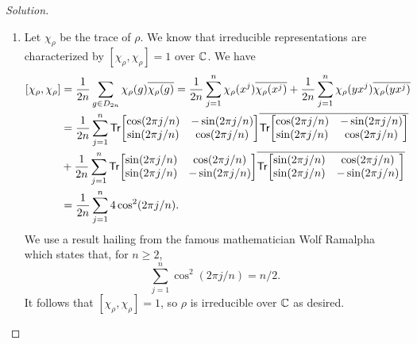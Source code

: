 \begin{proof}[Solution]
\begin{enumerate}[font=\normalfont,label=\textbf{(\alph*)}, wide]
\item Let $\chi_\rho$ be the trace of $\rho$. We know that irreducible representations are characterized by $[\chi_\rho, \chi_\rho] = 1$ over $\mathbb{C}$. We have
\[
\begin{aligned}
[\chi_\rho, \chi_\rho] &= \frac{1}{2n}\sum_{g \in D_{2n}}  \chi_\rho(g)\overline{\chi_\rho(g)} = \frac{1}{2n}\sum_{j = 1}^n  \chi_\rho(x^j)\overline{\chi_\rho(x^j)} + \frac{1}{2n}\sum_{j = 1}^n  \chi_\rho(yx^j)\overline{\chi_\rho(yx^j)} \\
&= \frac{1}{2n}\sum_{j = 1}^n
\Tr{
\begin{bmatrix}
\cos(2\pi j/n) & -\sin(2\pi j/n) \\
\sin(2\pi j/n) & \cos(2\pi j/n)
\end{bmatrix}
}
\overline{
\Tr{
\begin{bmatrix}
\cos(2\pi j/n) & -\sin(2\pi j/n) \\
\sin(2\pi j/n) & \cos(2\pi j/n)
\end{bmatrix}
}
} \\
&+
\frac{1}{2n}\sum_{j = 1}^n
\Tr{
\begin{bmatrix}
\sin(2\pi j/n) & \cos(2\pi j/n) \\
\sin(2\pi j/n) & -\sin(2\pi j/n)
\end{bmatrix}
}
\overline{
\Tr{
\begin{bmatrix}
\sin(2\pi j/n) & \cos(2\pi j/n) \\
\sin(2\pi j/n) & -\sin(2\pi j/n)
\end{bmatrix}
}
} \\
&= \frac{1}{2n} \sum_{j = 1}^n 4\cos^2(2\pi j/n). \\
\end{aligned}
\]
We use a result hailing from the famous mathematician Wolf Ramalpha which states that, for $n \geq 2$,
\[
\sum_{j=1}^n \cos^2(2\pi j/n) = n/2.
\]
It follows that $[\chi_\rho, \chi_\rho] = 1$, so $\rho$ is irreducible over $\mathbb{C}$ as desired.



\end{enumerate}
\end{proof}
